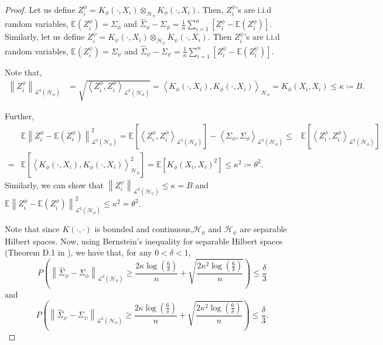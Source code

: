 \documentclass[11pt]{article}
\newcommand{\E}{\mathbb{E}}
\newcommand{\HS}{\mathcal{L}^{2}}
\newcommand{\repone}{\phi}
\newcommand{\reptwo}{\psi}
\newcommand{\Hone}{\mathcal{H}_{\phi}}
\newcommand{\Htwo}{\mathcal{H}_{\psi}}
\newcommand{\norm}[1]{\left\|#1\right\|}
\newcommand{\inprod}[1]{\left \langle #1 \right\rangle}
\theoremstyle{plain}
\begin{document}
\begin{proof}
Let us define $Z_{i}^{\repone} = K_{\repone}(\cdot,X_{i})\otimes_{\Hone}K_{\repone}(\cdot,X_{i})$. Then, $Z_{i}^{\repone}$'s are i.i.d random variables, $\E(Z_{i}^{\repone}) = \Sigma_{\repone}$ and $\hat{\Sigma}_{\repone} - \Sigma_{\repone} = \frac{1}{n}\sum_{i=1}^{n}\left[Z_{i}^{\repone}-\E(Z_{i}^{\repone})\right]$. Similarly, let us define $Z_{i}^{\reptwo} = K_{\reptwo}(\cdot,X_{i})\otimes_{\Htwo}K_{\reptwo}(\cdot,X_{i})$. Then $Z_{i}^{\reptwo}$'s are i.i.d random variables, $\E(Z_{i}^{\reptwo}) = \Sigma_{\reptwo}$ and $\hat{\Sigma}_{\reptwo} - \Sigma_{\reptwo} = \frac{1}{n}\sum_{i=1}^{n}\left[Z_{i}^{\reptwo}-\E(Z_{i}^{\reptwo})\right]$.

Note that,
\[
\begin{aligned}
    \norm{Z_{i}^{\repone}}_{\HS(\Hone)}    &=\sqrt{\inprod{Z_{i}^{\repone},Z_{i}^{\repone}}_{\HS(\Hone)}}
    =\inprod{K_{\repone}(\cdot,X_{i}),K_{\repone}(\cdot,X_{i})}_{\Hone}
    =K_{\repone}(X_{i},X_{i})
    \leq \kappa \coloneq B.
\end{aligned}
\]

Further, 
\[
\begin{aligned}
   &\E\norm{Z_{i}^{\repone}-\E(Z_{i}^{\repone})}_{\HS(\Hone)}^{2}
   =\E\left[\inprod{Z_{i}^{\repone},Z_{i}^{\repone}}_{\HS(\Hone)}\right] - \inprod{\Sigma_{\repone},\Sigma_{\repone}}_{\HS(\Hone)}
   \leq& \E\left[\inprod{Z_{i}^{\repone},Z_{i}^{\repone}}_{\HS(\Hone)}\right]\\
   =&\E\left[\inprod{K_{\repone}(\cdot,X_{i}),K_{\repone}(\cdot,X_{i})}_{\Hone}^{2}\right]
   =\E\left[K_{\repone}(X_{i},X_{i})^{2}\right]
   \leq \kappa^{2} \coloneq \theta^{2}.
\end{aligned}
\]
Similarly, we can show that $\norm{Z_{i}^{\reptwo}}_{\HS(\Htwo)}\leq \kappa = B$ and $\E\norm{Z_{i}^{\repone}-\E(Z_{i}^{\repone})}_{\HS(\Hone)}^{2}\leq \kappa^{2} = \theta^{2}$.

Note that since $K(\cdot,\cdot)$ is bounded and continuous,$\Hone$ and $\Htwo$ are separable Hilbert spaces. Now, using Bernstein's inequality for separable Hilbert spaces (Theorem D.1 in \citet{sriperumbudur2022approximate}), we have that, for any $0<\delta<1$,
\[
P\left(\norm{\hat{\Sigma}_{\repone}-\Sigma_{\repone}}_{\HS(\Hone)} \geq \frac{2\kappa\log(\frac{6}{\delta})}{n} + \sqrt{\frac{2\kappa^{2}\log(\frac{6}{\delta})}{n}}\right) \leq \frac{\delta}{3}
\]
and 
\[
P\left(\norm{\hat{\Sigma}_{\reptwo}-\Sigma_{\reptwo}}_{\HS(\Hone)} \geq \frac{2\kappa\log(\frac{6}{\delta})}{n} + \sqrt{\frac{2\kappa^{2}\log(\frac{6}{\delta})}{n}}\right) \leq \frac{\delta}{3}.
\]


\end{proof}
\end{document}

